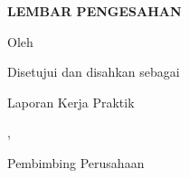 \begin{titlepage}
\begin{center}
{\bfseries\Large LEMBAR PENGESAHAN\par}
\vspace{0.7cm}
{\bfseries\large \JudulLaporan\par}
\vspace{0.8cm}
Oleh\par
\NamaBerdua
\vfill
Disetujui dan disahkan sebagai\par Laporan Kerja Praktik\par
\vspace{0.7cm}
\Kota, \TanggalPengesahan\par
Pembimbing Perusahaan\par \TempatKP\par
\TandaTanganGita\par
\underline{\NamaPembimbingPerusahaan}\par
\JabatanPembimbingPerusahaan
\vfill
\end{center}
\end{titlepage}
